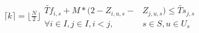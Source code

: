 \documentclass{article}
\begin{document}
\begin{align}
        \lceil k \rceil = \lfloor\frac{N}{2}\rfloor

        \begin{split}
            \widetilde{Tf}_{i,s} + M*(2-Z_{i,u,s}-&Z_{j,u,s}) \leq 
            \widetilde{Ts}_{j,s} \\
            \forall i \in I, j \in I, i < j,& s \in S, u \in U_{s}    
        \end{split}

    \end{align}
\end{document}
